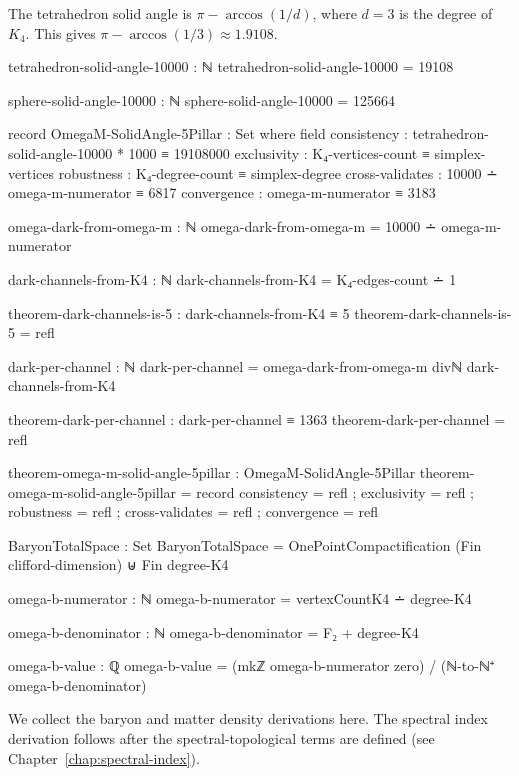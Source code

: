 \documentclass[11pt,a4paper]{book}
\begin{document}
The tetrahedron solid angle is $\pi - \arccos(1/d)$, where $d = 3$ is the degree of $K_4$.
This gives $\pi - \arccos(1/3) \approx 1.9108$.

\begin{code}
tetrahedron-solid-angle-10000 : ℕ
tetrahedron-solid-angle-10000 = 19108
\end{code}

\begin{code}
sphere-solid-angle-10000 : ℕ
sphere-solid-angle-10000 = 125664
\end{code}

\begin{code}
record OmegaM-SolidAngle-5Pillar : Set where
  field
    consistency     : tetrahedron-solid-angle-10000 * 1000 ≡ 19108000
    exclusivity     : K₄-vertices-count ≡ simplex-vertices
    robustness      : K₄-degree-count ≡ simplex-degree
    cross-validates : 10000 ∸ omega-m-numerator ≡ 6817
    convergence     : omega-m-numerator ≡ 3183

omega-dark-from-omega-m : ℕ
omega-dark-from-omega-m = 10000 ∸ omega-m-numerator

dark-channels-from-K4 : ℕ
dark-channels-from-K4 = K₄-edges-count ∸ 1

theorem-dark-channels-is-5 : dark-channels-from-K4 ≡ 5
theorem-dark-channels-is-5 = refl

dark-per-channel : ℕ
dark-per-channel = omega-dark-from-omega-m divℕ dark-channels-from-K4

theorem-dark-per-channel : dark-per-channel ≡ 1363
theorem-dark-per-channel = refl

theorem-omega-m-solid-angle-5pillar : OmegaM-SolidAngle-5Pillar
theorem-omega-m-solid-angle-5pillar = record
  { consistency     = refl
  ; exclusivity     = refl
  ; robustness      = refl
  ; cross-validates = refl
  ; convergence     = refl
  }
\end{code}

\begin{code}
BaryonTotalSpace : Set
BaryonTotalSpace = OnePointCompactification (Fin clifford-dimension) ⊎ Fin degree-K4

omega-b-numerator : ℕ
omega-b-numerator = vertexCountK4 ∸ degree-K4

omega-b-denominator : ℕ
omega-b-denominator = F₂ + degree-K4

omega-b-value : ℚ
omega-b-value = (mkℤ omega-b-numerator zero) / (ℕ-to-ℕ⁺ omega-b-denominator)
\end{code}

We collect the baryon and matter density derivations here. 
The spectral index derivation follows after the spectral-topological terms are defined
(see Chapter~\ref{chap:spectral-index}).
\end{document}
